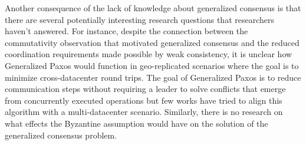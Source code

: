 \documentclass[runningheads,a4paper]{llncs}
\begin{document}
Another consequence of the lack of knowledge about generalized consensus is that there are several potentially interesting research questions that researchers haven't answered. For instance, despite the connection between the commutativity observation that motivated generalized consensus and the reduced coordination requirements made possible by weak consistency, it is unclear how Generalized Paxos would function in geo-replicated scenarios where the goal is to minimize cross-datacenter round trips. The goal of Generalized Paxos is to reduce communication steps without requiring a leader to solve conflicts that emerge from concurrently executed operations but few works have tried to align this algorithm with a multi-datacenter scenario. Similarly, there is no research on what effects the Byzantine assumption would have on the solution of the generalized consensus problem.
\par
\end{document}
